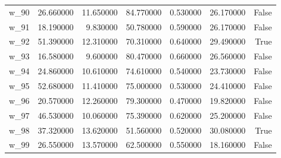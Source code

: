 \begin{table}
\begin{tabular}{lrrrrrr}
w\_90 & 26.660000 & 11.650000 & 84.770000 & 0.530000 & 26.170000 & False \\
w\_91 & 18.190000 & 9.830000 & 50.780000 & 0.590000 & 26.170000 & False \\
w\_92 & 51.390000 & 12.310000 & 70.310000 & 0.640000 & 29.490000 & True \\
w\_93 & 16.580000 & 9.600000 & 80.470000 & 0.660000 & 26.560000 & False \\
w\_94 & 24.860000 & 10.610000 & 74.610000 & 0.540000 & 23.730000 & False \\
w\_95 & 52.680000 & 11.410000 & 75.000000 & 0.530000 & 24.410000 & False \\
w\_96 & 20.570000 & 12.260000 & 79.300000 & 0.470000 & 19.820000 & False \\
w\_97 & 46.530000 & 10.060000 & 75.390000 & 0.620000 & 25.200000 & False \\
w\_98 & 37.320000 & 13.620000 & 51.560000 & 0.520000 & 30.080000 & True \\
w\_99 & 26.550000 & 13.570000 & 62.500000 & 0.550000 & 18.160000 & False \\
\bottomrule
\end{tabular}
\end{table}
